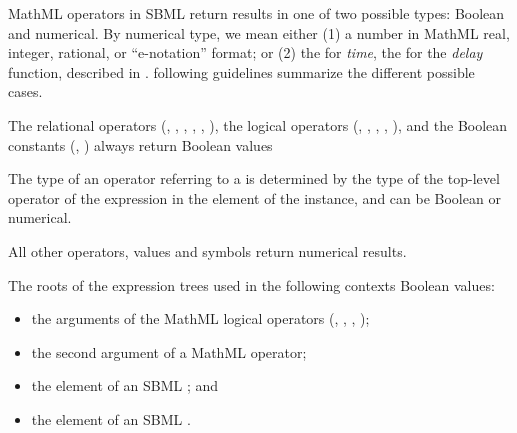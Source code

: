\label{sec:mathmltype}

MathML operators in SBML return results in one of two
possible types: Boolean and numerical.  By numerical type,
we mean either (1) a number in MathML real, integer, rational, or
``e-notation'' format; or (2) the  for \emph{time},
the  for the \emph{delay} function,  described in
.
 following guidelines
summarize the different possible cases.

The relational operators (, , ,
, , ), the logical operators
(, , , , ), and the
Boolean constants (, ) always return
Boolean values

The type of an operator referring to a \FunctionDefinition is
determined by the type of the top-level operator of the expression
in the  element of the \FunctionDefinition
instance, and can be Boolean or numerical.

All other operators, values and symbols return numerical
results.

The roots of the expression trees used in the following contexts
 Boolean values:

\begin{itemize}\setlength{\parskip}{-0.2ex}

\item the arguments of the MathML logical operators (,
, , );

\item the second argument of a MathML  operator;

\item the  element of an SBML \Event; and

\item the  element of an SBML \Constraint.

\end{itemize}

